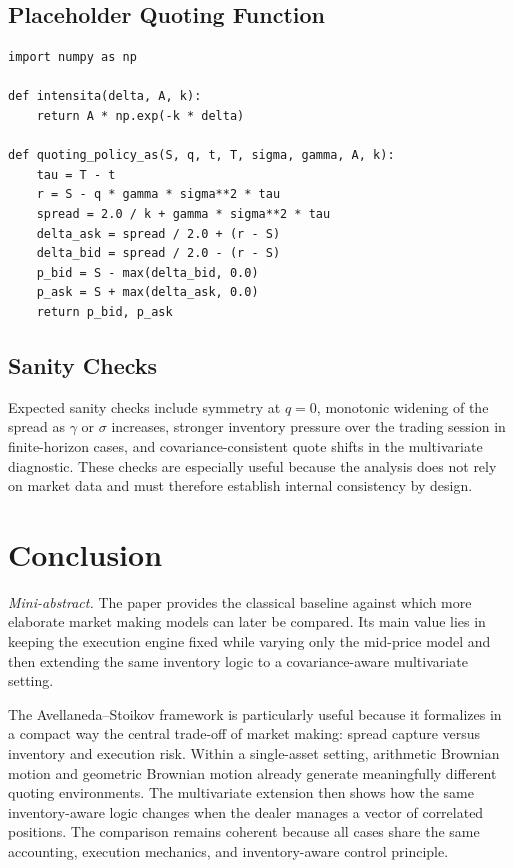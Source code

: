 \documentclass[a4paper,10pt,titlepage,oneside,openany]{book}
\theoremstyle{plain}\newtheorem{theorem}{Theorem}[chapter]
\theoremstyle{definition}\newtheorem{definition}{Definition}[chapter]
\theoremstyle{remark}\newtheorem{remark}{Remark}[chapter]
\newcommand{\miniabstract}[1]{%
\vspace{-2pt}
\begin{tcolorbox}[colback=gray!6,colframe=black!15,boxrule=0.3pt,arc=3pt,left=6pt,right=6pt,top=4pt,bottom=4pt]
\textit{Mini-abstract.} #1
\end{tcolorbox}
\vspace{-4pt}
}
\begin{document}
\section{Placeholder Quoting Function}
\begin{lstlisting}[caption={Illustrative structure of an Avellaneda--Stoikov quoting rule},label={lst:as_policy_1}]
import numpy as np

def intensita(delta, A, k):
    return A * np.exp(-k * delta)

def quoting_policy_as(S, q, t, T, sigma, gamma, A, k):
    tau = T - t
    r = S - q * gamma * sigma**2 * tau
    spread = 2.0 / k + gamma * sigma**2 * tau
    delta_ask = spread / 2.0 + (r - S)
    delta_bid = spread / 2.0 - (r - S)
    p_bid = S - max(delta_bid, 0.0)
    p_ask = S + max(delta_ask, 0.0)
    return p_bid, p_ask
\end{lstlisting}

\section{Sanity Checks}
Expected sanity checks include symmetry at $q=0$, monotonic widening of the spread as $\gamma$ or $\sigma$ increases, stronger inventory pressure over the trading session in finite-horizon cases, and covariance-consistent quote shifts in the multivariate diagnostic. These checks are especially useful because the analysis does not rely on market data and must therefore establish internal consistency by design.

\chapter{Conclusion}
\miniabstract{The paper provides the classical baseline against which more elaborate market making models can later be compared. Its main value lies in keeping the execution engine fixed while varying only the mid-price model and then extending the same inventory logic to a covariance-aware multivariate setting.}

The Avellaneda--Stoikov framework is particularly useful because it formalizes in a compact way the central trade-off of market making: spread capture versus inventory and execution risk. Within a single-asset setting, arithmetic Brownian motion and geometric Brownian motion already generate meaningfully different quoting environments. The multivariate extension then shows how the same inventory-aware logic changes when the dealer manages a vector of correlated positions. The comparison remains coherent because all cases share the same accounting, execution mechanics, and inventory-aware control principle.
\end{document}
